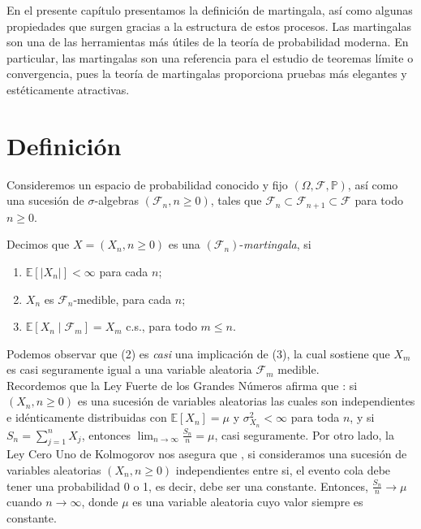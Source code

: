 En el presente capítulo presentamos la definición de martingala, así como algunas propiedades que surgen gracias a la estructura de estos procesos. Las martingalas son una de las herramientas más útiles de la teoría de probabilidad moderna. En particular, las martingalas son una referencia para el estudio de teoremas límite o convergencia, pues la teoría de martingalas proporciona pruebas más elegantes y estéticamente atractivas.

\section{Definición}
Consideremos un espacio de probabilidad conocido y fijo $(\Omega, \mathcal{F}, \mathbb{P})$, así como una sucesión de $\sigma$-algebras $(\mathcal{F}_n, n \geq 0)$, tales que $\mathcal{F}_n \subset \mathcal{F}_{n+1} \subset \mathcal{F}$ para todo $n \geq 0$.

\begin{definition}[Martingala]
\label{martingala}
	Decimos que $X = (X_n, n \geq 0)$ es una $(\mathcal{F}_n)$-\emph{martingala}, si
	\begin{enumerate}
		\item $\mathbb{E}[|X_n|] < \infty$ para cada $n$;
		\item $X_n$ es $\mathcal{F}_n$-medible, para cada $n$;
		\item $\mathbb{E}[X_n \mid \mathcal{F}_m] = X_m$ c.s., para todo $m \leq n$.
	\end{enumerate}
\end{definition}

Podemos observar que (2) es \emph{casi} una implicación de (3), la cual sostiene que $X_m$ es casi seguramente igual a una variable aleatoria $\mathcal{F}_m$ medible. \\

Recordemos que la Ley Fuerte de los Grandes Números afirma que \cite[p.~173]{jacodprotter}: si $(X_n, n \geq 0)$ es una sucesión de variables aleatorias las cuales son independientes e idénticamente distribuidas con $\mathbb{E}[X_n] = \mu$ y $\sigma_{X_n}^{2} < \infty$ para toda $n$, y si $S_n = \sum_{j=1}^{n} X_j$, entonces $\lim_{n \rightarrow \infty} \frac{S_n}{n} = \mu$, casi seguramente. Por otro lado, la Ley Cero Uno de Kolmogorov nos asegura que \cite[p.~381]{shiryaev}, si consideramos una sucesión de variables aleatorias $(X_n, n \geq 0)$ independientes entre si, el evento cola debe tener una probabilidad 0 o 1, es decir, debe ser una constante. Entonces, $\frac{S_n}{n} \rightarrow \mu$ cuando $n \rightarrow \infty$, donde $\mu$ es una variable aleatoria cuyo valor siempre es constante. \\

